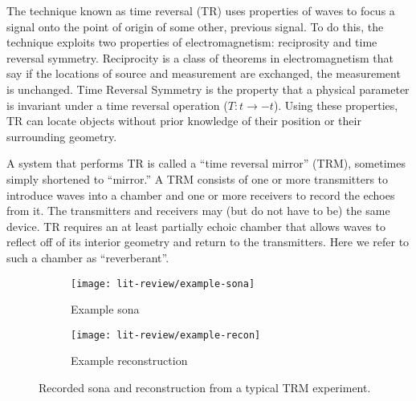 The technique known as time reversal (TR) uses properties of waves to focus a signal onto the point of origin of some other, previous signal. To do this, the technique exploits two properties of electromagnetism: reciprosity and time reversal symmetry. Reciprocity is a class of theorems in electromagnetism that say if the locations of source and measurement are exchanged, the measurement is unchanged. Time Reversal Symmetry is the property that a physical parameter is invariant under a time reversal operation ($T : t\rightarrow-t$). Using these properties, TR can locate objects without prior knowledge of their position or their surrounding geometry.

A system that performs TR is called a ``time reversal mirror'' (TRM), sometimes simply shortened to ``mirror.'' A TRM consists of one or more transmitters to introduce waves into a chamber and one or more receivers to record the echoes from it. The transmitters and receivers may (but do not have to be) the same device. TR requires an at least partially echoic chamber that allows waves to reflect off of its interior geometry and return to the transmitters. Here we refer to such a chamber as ``reverberant''.

\begin{figure}
    \centering
    \begin{subfigure}{.85\textwidth}
        \centering
        \texttt{[image: lit-review/example-sona]}
        \caption[Example sona]{Example sona}
         \label{fig:lit-review-example-sona}
    \end{subfigure}
		\par\bigskip
    \begin{subfigure}{.85\textwidth}
        \centering
        \texttt{[image: lit-review/example-recon]}
        \caption[Example reconstruction]{Example reconstruction}
         \label{fig:lit-review-example-recon}
    \end{subfigure}
    \caption{Recorded sona and reconstruction from a typical TRM experiment.}
    \label{fig:lit-review-example}
\end{figure}

